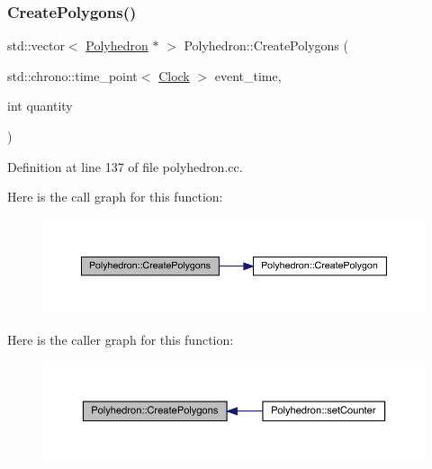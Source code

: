\subsubsection{\texorpdfstring{Create\+Polygons()}{CreatePolygons()}}
{\footnotesize\ttfamily std\+::vector$<$ \hyperlink{class_polyhedron}{Polyhedron} $\ast$ $>$ Polyhedron\+::\+Create\+Polygons (\begin{DoxyParamCaption}\item[{std\+::chrono\+::time\+\_\+point$<$ \hyperlink{universe_8h_a0ef8d951d1ca5ab3cfaf7ab4c7a6fd80}{Clock} $>$}]{event\+\_\+time,  }\item[{int}]{quantity }\end{DoxyParamCaption})}



Definition at line 137 of file polyhedron.\+cc.

Here is the call graph for this function\+:
\nopagebreak
\begin{figure}[H]
\begin{center}
\leavevmode
\includegraphics[width=350pt]{class_polyhedron_a1848eb8747c1132c40c2d27336af2896_cgraph}
\end{center}
\end{figure}
Here is the caller graph for this function\+:
\nopagebreak
\begin{figure}[H]
\begin{center}
\leavevmode
\includegraphics[width=350pt]{class_polyhedron_a1848eb8747c1132c40c2d27336af2896_icgraph}
\end{center}
\end{figure}
\mbox{\label{class_polyhedron_a2fcc5144ebc64363f40c31d2b980cfaf}} 
